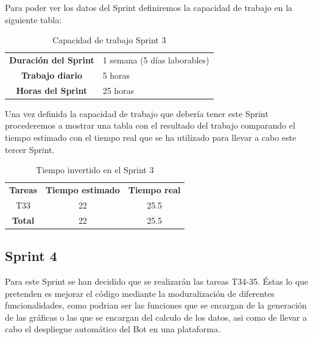 Para poder ver los datos del Sprint definiremos la capacidad de trabajo en la siguiente tabla:

\begin{table}[H]
	\begin{center}
		\begin{tabular}{| c | p{9cm} |}
			\hline
			
			\textbf{Duración del Sprint} & 1 semana (5 días laborables) \\
			\textbf{Trabajo diario} & 5 horas \\
			\textbf{Horas del Sprint} & 25 horas \\ \hline
		\end{tabular}
		\caption{Capacidad de trabajo Sprint 3}

	\end{center}
\end{table}

Una vez definida la capacidad de trabajo que debería tener este Sprint procederemos a mostrar una tabla con el resultado del trabajo comparando el tiempo estimado con el tiempo real que se ha utilizado para llevar a cabo este tercer Sprint.

\begin{table}[H]
	\begin{center}
		\begin{tabular}{| c | c | c |}
			\hline
			
			\textbf{Tareas} & \textbf{Tiempo estimado} & \textbf{Tiempo real} \\
			T33 & 22 & 25.5 \\
			\textbf{Total} & 22 & 25.5 \\ \hline
		\end{tabular}
		\caption{Tiempo invertido en el Sprint 3}
	\end{center}
\end{table}

\subsection{Sprint 4}

Para este Sprint se han decidido que se realizarán las tareas T34-35. Éstas lo que pretenden es mejorar el código mediante la moduralización de diferentes funcionalidades, como podrian ser las funciones que se encargan de la generación de las gráficas o las que se encargan del calculo de los datos, asi como de llevar a cabo el despliegue automático del Bot en una plataforma.

